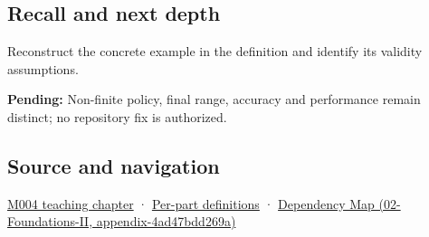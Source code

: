 \subsection{Recall and next depth}\label{appendix-7f1e17dcafb1-recall-and-next-depth}

Reconstruct the concrete example in the definition and identify its validity assumptions.

\textbf{Pending:} Non-finite policy, final range, accuracy and performance remain distinct; no repository fix is authorized.

\subsection{Source and navigation}\label{appendix-7f1e17dcafb1-source-and-navigation}

\hyperref[01-foundations-i-ch001-a-stretching-ruler-for-real-valued-quantities]{M004 teaching chapter} · \hyperref[appendix-fd090d982a15-m004---parts-61-76]{Per-part definitions} · \href{../02-Foundations-II/main.pdf\#nameddest=appendix-4ad47bdd269a}{Dependency Map (02-Foundations-II, appendix-4ad47bdd269a)}
